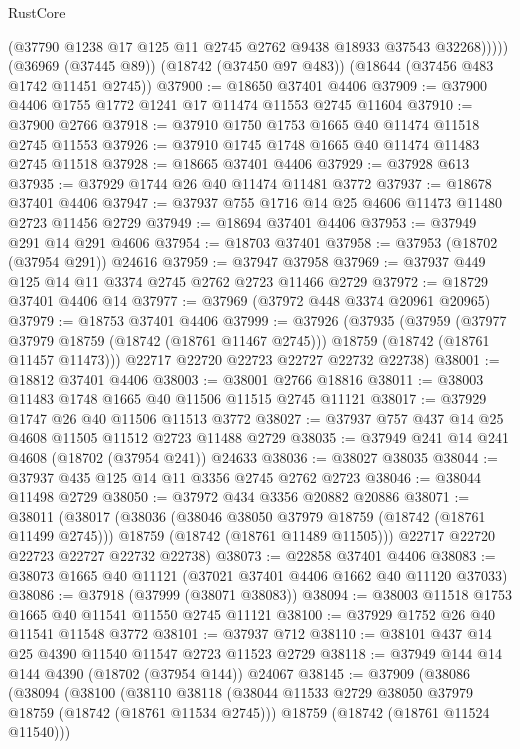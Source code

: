 \begin{lexlean}{RustCore}
\begin{coremodule}
            (@37790 @1238 @17 @125 @11 @2745 @2762 @9438 @18933 @37543 @32268)))))
    (@36969 (@37445 @89))
    (@18742 (@37450 @97 @483))
    (@18644 (@37456 @483 @1742 @11451 @2745))
@37900 := @18650 @37401 @4406
@37909 := @37900 @4406 @1755 @1772 @1241 @17 @11474 @11553 @2745 @11604
@37910 := @37900 @2766
@37918 := @37910 @1750 @1753 @1665 @40 @11474 @11518 @2745 @11553
@37926 := @37910 @1745 @1748 @1665 @40 @11474 @11483 @2745 @11518
@37928 := @18665 @37401 @4406
@37929 := @37928 @613
@37935 := @37929 @1744 @26 @40 @11474 @11481 @3772
@37937 := @18678 @37401 @4406
@37947 := @37937 @755 @1716 @14 @25 @4606 @11473 @11480 @2723 @11456 @2729
@37949 := @18694 @37401 @4406
@37953 := @37949 @291 @14 @291 @4606
@37954 := @18703 @37401
@37958 := @37953 (@18702 (@37954 @291)) @24616
@37959 := @37947 @37958
@37969 := @37937 @449 @125 @14 @11 @3374 @2745 @2762 @2723 @11466 @2729
@37972 := @18729 @37401 @4406 @14
@37977 := @37969 (@37972 @448 @3374 @20961 @20965)
@37979 := @18753 @37401 @4406
@37999 := @37926
    (@37935
      (@37959
        (@37977 @37979 @18759 (@18742 (@18761 @11467 @2745)))
        @18759
        (@18742 (@18761 @11457 @11473)))
      @22717
      @22720
      @22723
      @22727
      @22732
      @22738)
@38001 := @18812 @37401 @4406
@38003 := @38001 @2766 @18816
@38011 := @38003 @11483 @1748 @1665 @40 @11506 @11515 @2745 @11121
@38017 := @37929 @1747 @26 @40 @11506 @11513 @3772
@38027 := @37937 @757 @437 @14 @25 @4608 @11505 @11512 @2723 @11488 @2729
@38035 := @37949 @241 @14 @241 @4608 (@18702 (@37954 @241)) @24633
@38036 := @38027 @38035
@38044 := @37937 @435 @125 @14 @11 @3356 @2745 @2762 @2723
@38046 := @38044 @11498 @2729
@38050 := @37972 @434 @3356 @20882 @20886
@38071 := @38011
    (@38017
      (@38036
        (@38046 @38050 @37979 @18759 (@18742 (@18761 @11499 @2745)))
        @18759
        (@18742 (@18761 @11489 @11505)))
      @22717
      @22720
      @22723
      @22727
      @22732
      @22738)
@38073 := @22858 @37401 @4406
@38083 := @38073 @1665 @40 @11121 (@37021 @37401 @4406 @1662 @40 @11120 @37033)
@38086 := @37918 (@37999 (@38071 @38083))
@38094 := @38003 @11518 @1753 @1665 @40 @11541 @11550 @2745 @11121
@38100 := @37929 @1752 @26 @40 @11541 @11548 @3772
@38101 := @37937 @712
@38110 := @38101 @437 @14 @25 @4390 @11540 @11547 @2723 @11523 @2729
@38118 := @37949 @144 @14 @144 @4390 (@18702 (@37954 @144)) @24067
@38145 := @37909
    (@38086
      (@38094
        (@38100
          (@38110
            @38118
            (@38044 @11533 @2729 @38050 @37979 @18759 (@18742 (@18761 @11534 @2745)))
            @18759
            (@18742 (@18761 @11524 @11540)))

\end{coremodule}
\end{lexlean}
